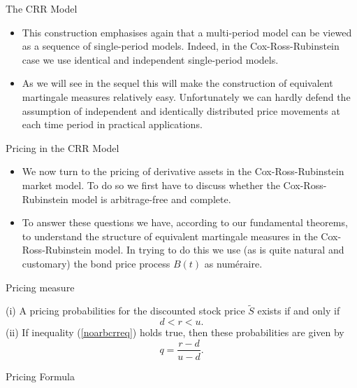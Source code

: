 { The CRR Model}

\begin{itemize}
  \item This construction emphasises again that a multi-period model can
be viewed as a sequence of single-period models. Indeed, in the
Cox-Ross-Rubinstein case we use identical and independent
single-period models.
\item As we will see in the sequel this will make
the construction of equivalent martingale measures relatively
easy. Unfortunately we can hardly defend the assumption of
independent and identically distributed price movements at each
time period in practical applications.
\end{itemize}




{Pricing in the CRR Model}

\begin{itemize}
  \item We now turn to the pricing of derivative assets in the
Cox-Ross-Rubinstein market model. To do so we first have to
discuss whether the Cox-Ross-Rubinstein model is arbitrage-free
and complete.
\item To answer these questions we have, according to our fundamental
theorems, to
understand the structure of equivalent martingale measures in the
Cox-Ross-Rubinstein model. In trying to do this we use (as is
quite natural and customary) the bond price process $B(t)$ as
num\'{e}raire.
\end{itemize}




{Pricing measure}


(i) A pricing probabilities for the discounted stock price
$\tilde{S}$ exists if and only if
\begin{equation}\label{noarbcrreq}
d < r < u.
\end{equation}
(ii) If inequality (\ref{noarbcrreq}) holds true, then these probabilities are given by
\begin{equation}\label{crrprob}
q=\frac{r-d}{u-d}.
\end{equation}






{Pricing Formula}


